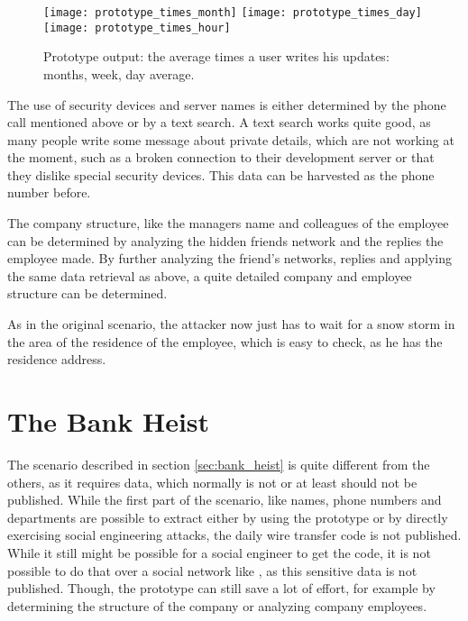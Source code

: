 \begin{figure}[htb]
  \begin{center}
    \texttt{[image: prototype\_times\_month]} 
    \texttt{[image: prototype\_times\_day]} 
    \texttt{[image: prototype\_times\_hour]}
    \caption{Prototype output: the average times a user writes his updates: months,
    week, day average.}
    \label{fig:prototype_times}
  \end{center}
\end{figure}

The use of security devices and server names is either determined by the phone
call mentioned above or by a text search. A text search works quite good, as
many people write some message about private details, which are not
working at the moment, such as a broken connection to their development server or
that they dislike special security devices. This data can be harvested as the
phone number before.

The company structure, like the managers name and colleagues of the employee
can be determined by analyzing the hidden friends network and the replies the
employee made. By further analyzing the friend's networks, replies and applying
the same data retrieval as above, a quite detailed company and employee
structure can be determined.

As in the original scenario, the attacker now just has to wait for a snow storm
in the area of the residence of the employee, which is easy to check, as he
has the residence address.

\section{The Bank Heist}

The scenario described in section \ref{sec:bank_heist} is quite different from
the others, as it requires data, which normally is not or at least should not
be published. While the first part of the scenario, like names, phone numbers
and departments are possible to extract either by using the prototype or by
directly exercising social engineering attacks, the daily wire transfer code is not
published. While it still might be possible for a social engineer to get the
code, it is not possible to do that over a social network like \Twitter{}, as
this sensitive data is not published. Though, the prototype can still save a
lot of effort, for example by determining the structure of the company or
analyzing company employees.


